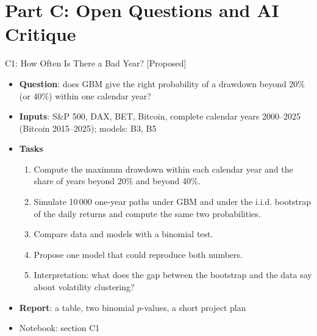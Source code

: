 \section{Part C: Open Questions and AI Critique}

\begin{frame}{C1: How Often Is There a Bad Year? [Proposed]}
\itemsize{\footnotesize}
\begin{itemize}
\item \textbf{Question}: does GBM give the right probability of a drawdown beyond 20\% (or 40\%) within one calendar year?
\item \textbf{Inputs}: S\&P 500, DAX, BET, Bitcoin, complete calendar years 2000--2025 (Bitcoin 2015--2025); models: B3, B5
\item \textbf{Tasks}
\begin{enumerate}
    \item Compute the maximum drawdown within each calendar year and the share of years beyond 20\% and beyond 40\%.
    \item Simulate 10\,000 one-year paths under GBM and under the i.i.d. bootstrap of the daily returns and compute the same two probabilities.
    \item Compare data and models with a binomial test.
    \item Propose one model that could reproduce both numbers.
    \item Interpretation: what does the gap between the bootstrap and the data say about volatility clustering?
\end{enumerate}
\item \textbf{Report}: a table, two binomial $p$-values, a short project plan
\item Notebook: section C1
\end{itemize}
\end{frame}

